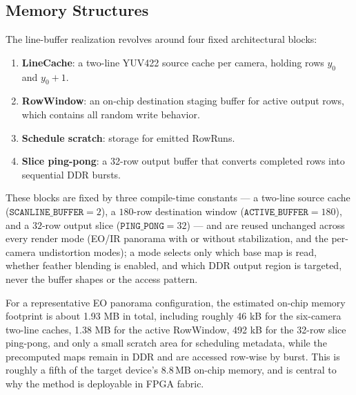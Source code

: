 \documentclass[journal]{IEEEtran}
\begin{document}
\subsection{Memory Structures}
The line-buffer realization revolves around four fixed architectural blocks:
\begin{enumerate}[leftmargin=*,itemsep=0pt,topsep=2pt]
  \item \textbf{LineCache}: a two-line YUV422 source cache per camera, holding rows $y_0$ and $y_0+1$.
  \item \textbf{RowWindow}: an on-chip destination staging buffer for active output rows, which contains all random write behavior.
  \item \textbf{Schedule scratch}: storage for emitted RowRuns.
  \item \textbf{Slice ping-pong}: a 32-row output buffer that converts completed rows into sequential DDR bursts.
\end{enumerate}

These blocks are fixed by three compile-time constants --- a two-line source cache ($\mathtt{SCANLINE\_BUFFER}{=}2$), a $180$-row destination window ($\mathtt{ACTIVE\_BUFFER}{=}180$), and a $32$-row output slice ($\mathtt{PING\_PONG}{=}32$) --- and are reused unchanged across every render mode (EO/IR panorama with or without stabilization, and the per-camera undistortion modes); a mode selects only which base map is read, whether feather blending is enabled, and which DDR output region is targeted, never the buffer shapes or the access pattern.

For a representative EO panorama configuration, the estimated on-chip memory footprint is about 1.93 MB in total, including roughly 46 kB for the six-camera two-line caches, 1.38 MB for the active RowWindow, 492 kB for the 32-row slice ping-pong, and only a small scratch area for scheduling metadata, while the precomputed maps remain in DDR and are accessed row-wise by burst. This is roughly a fifth of the target device's $8.8$\,MB on-chip memory, and is central to why the method is deployable in FPGA fabric.
\end{document}
